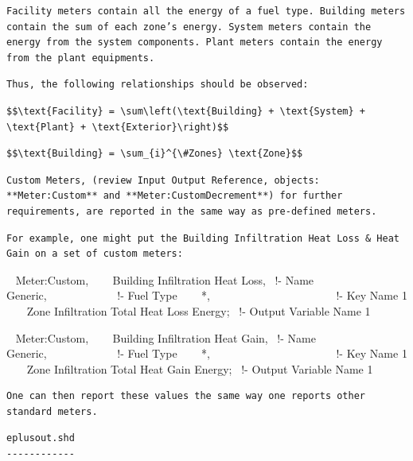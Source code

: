 \begin{lstlisting}
Facility meters contain all the energy of a fuel type. Building meters contain the sum of each zone’s energy. System meters contain the energy from the system components. Plant meters contain the energy from the plant equipments.
\end{lstlisting}

\begin{lstlisting}
Thus, the following relationships should be observed:
\end{lstlisting}

\begin{lstlisting}
$$\text{Facility} = \sum\left(\text{Building} + \text{System} + \text{Plant} + \text{Exterior}\right)$$ 
\end{lstlisting}

\begin{lstlisting}
$$\text{Building} = \sum_{i}^{\#Zones} \text{Zone}$$ 
\end{lstlisting}

\begin{lstlisting}
Custom Meters, (review Input Output Reference, objects: **Meter:Custom** and **Meter:CustomDecrement**) for further requirements, are reported in the same way as pre-defined meters.
\end{lstlisting}

\begin{lstlisting}
For example, one might put the Building Infiltration Heat Loss & Heat Gain on a set of custom meters:
\end{lstlisting}

~ Meter:Custom, ~~~ Building Infiltration Heat Loss,~ !- Name ~~~ Generic,~~~~~~~~~~~~ !- Fuel Type ~~~ *,~~~~~~~~~~~~~~~~~~~~~~ !- Key Name 1 ~~~ Zone Infiltration Total Heat Loss Energy;~ !- Output Variable Name 1

~ Meter:Custom, ~~ ~Building Infiltration Heat Gain,~ !- Name ~~~ Generic,~~~~~~~~~~~~ !- Fuel Type ~~~ *,~~~~~~~~~~~~~~~~~~~~~~ !- Key Name 1 ~~~ Zone Infiltration Total Heat Gain Energy;~ !- Output Variable Name 1

\begin{lstlisting}
One can then report these values the same way one reports other standard meters.
\end{lstlisting}

\begin{lstlisting}
eplusout.shd
------------
\end{lstlisting}

